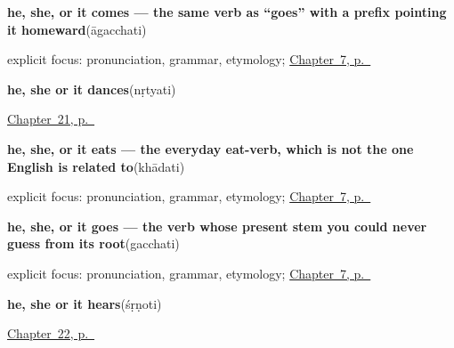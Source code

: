 \noindent\begin{minipage}[t]{\linewidth}
\raggedright
\textbf{he, she, or it comes — the same verb as \textquotedblleft{}goes\textquotedblright{} with a prefix pointing it homeward}\enspace\emph{}\enspace(āgacchati)\par
\footnotesize explicit focus: pronunciation, grammar, etymology; \hyperref[ch:sa-core-verbs]{Chapter~7, p.~\pageref*{ch:sa-core-verbs}}
\end{minipage}\par\smallskip

\noindent\begin{minipage}[t]{\linewidth}
\raggedright
\textbf{he, she or it dances}\enspace\emph{}\enspace(nṛtyati)\par
\footnotesize \hyperref[ch:sa-more-verbs]{Chapter~21, p.~\pageref*{ch:sa-more-verbs}}
\end{minipage}\par\smallskip

\noindent\begin{minipage}[t]{\linewidth}
\raggedright
\textbf{he, she, or it eats — the everyday eat-verb, which is not the one English is related to}\enspace\emph{}\enspace(khādati)\par
\footnotesize explicit focus: pronunciation, grammar, etymology; \hyperref[ch:sa-core-verbs]{Chapter~7, p.~\pageref*{ch:sa-core-verbs}}
\end{minipage}\par\smallskip

\noindent\begin{minipage}[t]{\linewidth}
\raggedright
\textbf{he, she, or it goes — the verb whose present stem you could never guess from its root}\enspace\emph{}\enspace(gacchati)\par
\footnotesize explicit focus: pronunciation, grammar, etymology; \hyperref[ch:sa-core-verbs]{Chapter~7, p.~\pageref*{ch:sa-core-verbs}}
\end{minipage}\par\smallskip

\noindent\begin{minipage}[t]{\linewidth}
\raggedright
\textbf{he, she or it hears}\enspace\emph{}\enspace(śṛṇoti)\par
\footnotesize \hyperref[ch:sa-verbs-of-mind]{Chapter~22, p.~\pageref*{ch:sa-verbs-of-mind}}
\end{minipage}\par\smallskip

